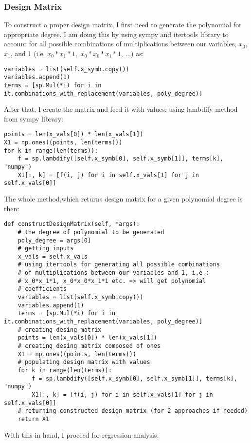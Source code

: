 \subsubsection{Design Matrix}
To construct a proper design matrix, I first need to generate the polynomial for appropriate degree. I am doing this by using sympy and itertools library to account for all possible combinations of multiplications between our variables, $x_0$, $x_1$, and 1 (i.e.
$x_0*x_1*1,$ $x_0*x_0*x_1*1$, ...) as:
\begin{lstlisting}
variables = list(self.x_symb.copy())
variables.append(1)
terms = [sp.Mul(*i) for i in it.combinations_with_replacement(variables, poly_degree)]
\end{lstlisting}
After that, I create the matrix and feed it with values, using lambdify method from sympy library:
\begin{lstlisting}
points = len(x_vals[0]) * len(x_vals[1])
X1 = np.ones((points, len(terms)))
for k in range(len(terms)):
    f = sp.lambdify([self.x_symb[0], self.x_symb[1]], terms[k], "numpy")
    X1[:, k] = [f(i, j) for i in self.x_vals[1] for j in self.x_vals[0]]
\end{lstlisting}
The whole method,which returns design matrix for a given polynomial degree is then:
\begin{lstlisting}
def constructDesignMatrix(self, *args):
    # the degree of polynomial to be generated
    poly_degree = args[0]
    # getting inputs
    x_vals = self.x_vals
    # using itertools for generating all possible combinations
    # of multiplications between our variables and 1, i.e.:
    # x_0*x_1*1, x_0*x_0*x_1*1 etc. => will get polynomial
    # coefficients
    variables = list(self.x_symb.copy())
    variables.append(1)
    terms = [sp.Mul(*i) for i in it.combinations_with_replacement(variables, poly_degree)]
    # creating desing matrix
    points = len(x_vals[0]) * len(x_vals[1])
    # creating desing matrix composed of ones
    X1 = np.ones((points, len(terms)))
    # populating design matrix with values
    for k in range(len(terms)):
        f = sp.lambdify([self.x_symb[0], self.x_symb[1]], terms[k], "numpy")
        X1[:, k] = [f(i, j) for i in self.x_vals[1] for j in self.x_vals[0]]
    # returning constructed design matrix (for 2 approaches if needed)
    return X1
\end{lstlisting}
With this in hand, I proceed for regression analysis.

